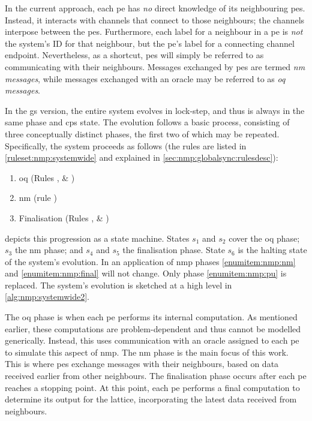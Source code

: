 In the current approach, each \gls{pe} has \emph{no} direct knowledge of its neighbouring \glspl{pe}.  Instead, it interacts with channels that connect to those neighbours; the channels interpose between the \glspl{pe}.  Furthermore, each label for a neighbour in a \gls{pe} is \emph{not} the system's ID for that neighbour, but the \gls{pe}'s label for a connecting channel endpoint.  Nevertheless, as a shortcut, \glspl{pe} will simply be referred to as communicating with their neighbours.  Messages exchanged by \glspl{pe} are termed \emph{\gls{nm} messages}, while messages exchanged with an oracle may be referred to as \emph{\gls{oq} messages}.

In the \gls{gs} version, the entire system evolves in lock-step, and thus is always in the same phase and \gls{cps} state.  The evolution follows a basic process, consisting of three conceptually distinct phases, the first two of which may be repeated.  Specifically, the system proceeds as follows (the rules are listed in \vref{ruleset:nmp:systemwide} and explained in \vref{sec:nmp:globalsync:rulesdesc}):

\begin{enumerate}
    \item\label{enumitem:nmp:pu} \Gls{oq} (Rules ,  \& )
    \item\label{enumitem:nmp:nm} \Gls{nm} (rule )
    \item\label{enumitem:nmp:final} Finalisation (Rules ,  \& )
\end{enumerate}

 depicts this progression as a state machine.  States \(s_1\) and \(s_2\) cover the \gls{oq} phase; \(s_3\) the \gls{nm} phase; and \(s_4\) and \(s_5\) the finalisation phase.  State \(s_6\) is the halting state of the system's evolution.  In an application of \gls{nmp} phases \ref{enumitem:nmp:nm} and \ref{enumitem:nmp:final} will not change.  Only phase \ref{enumitem:nmp:pu} is replaced.  The system's evolution is sketched at a high level in \cref{alg:nmp:systemwide2}.

The \gls{oq} phase is when each \gls{pe} performs its internal computation. As mentioned earlier, these computations are problem-dependent and thus cannot be modelled generically. Instead, this  uses communication with an oracle assigned to each \gls{pe} to simulate this aspect of \gls{nmp}. The \gls{nm} phase is the main focus of this work. This is where \glspl{pe} exchange messages with their neighbours, based on data received earlier from other neighbours. The finalisation phase occurs after each \gls{pe} reaches a stopping point. At this point, each \gls{pe} performs a final computation to determine its output for the lattice, incorporating the latest data received from neighbours.

